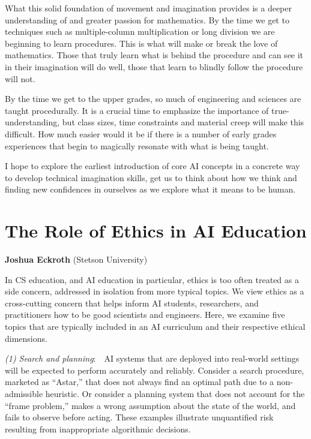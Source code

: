 \documentclass[letterpaper]{article}
\begin{document}
What this solid foundation of movement and imagination provides is a deeper understanding of and greater passion for mathematics.  By the time we get to techniques such as multiple-column multiplication or long division we are beginning to learn procedures.  This is what will make or break the love of mathematics.  Those that truly learn what is behind the procedure and can see it in their imagination will do well, those that learn to blindly follow the procedure will not.

By the time we get to the upper grades, so much of engineering and sciences are taught procedurally.  It is a crucial time to emphasize the importance of true-understanding, but class sizes, time constraints and material creep will make this difficult.  How much easier would it be if there is a number of early grades experiences that begin to magically resonate with what is being taught.

I hope to explore the earliest introduction of core AI concepts in a concrete way to develop technical imagination skills, get us to think about how we think and finding new confidences in ourselves as we explore what it means to be human.


\section{The Role of Ethics in AI Education}
\begin{center}
{\bf Joshua Eckroth} (Stetson University)
\end{center}


In CS education, and AI education in particular, ethics is too often treated as a side concern, addressed in isolation from more typical topics. We view ethics as a cross-cutting concern that helps inform AI students, researchers, and practitioners how to be good scientists and engineers. Here, we examine five topics that are typically included in an AI curriculum and their respective ethical dimensions.

{\em (1) Search and planning}:~~AI systems that are deployed into real-world settings will be expected to perform accurately and reliably. Consider a search procedure, marketed as ``Astar,'' that does not always find an optimal path due to a non-admissible heuristic. Or consider a planning system that does not account for the ``frame problem,'' makes a wrong assumption about the state of the world, and fails to observe before acting. These examples illustrate unquantified risk resulting from inappropriate algorithmic decisions.
\end{document}
